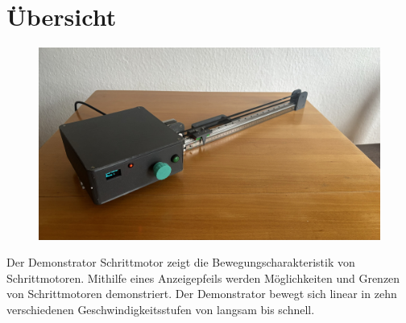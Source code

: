 %
%



\chapter{Übersicht}

\begin{figure}[htb]
	\begin{center}
		
			\includegraphics[width=\textwidth]{Images/DemonstratorDrauf.jpg}
	\end{center}
\end{figure}

Der Demonstrator Schrittmotor zeigt die Bewegungscharakteristik von Schrittmotoren. Mithilfe eines Anzeigepfeils werden Möglichkeiten und Grenzen von Schrittmotoren demonstriert. Der Demonstrator bewegt sich linear in zehn verschiedenen Geschwindigkeitsstufen von langsam bis schnell. 

